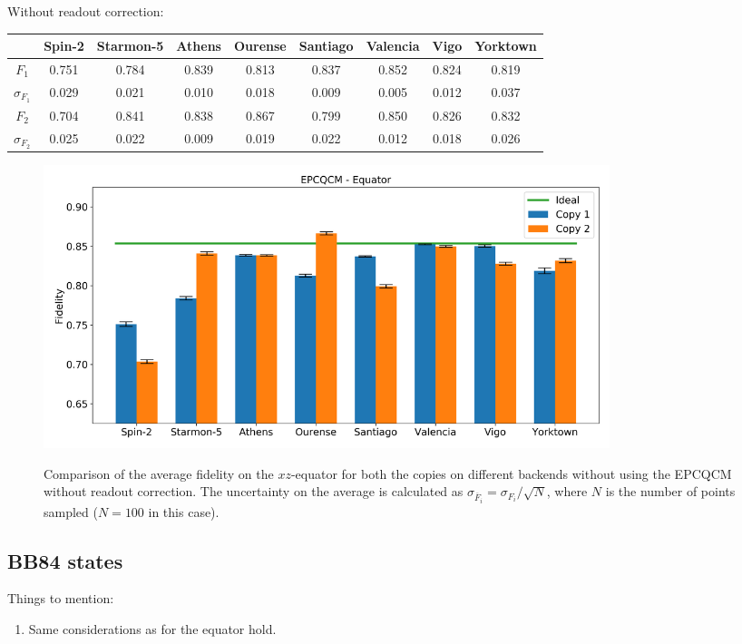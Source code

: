 Without readout correction:
\begin{table}[H]
    \centering
    \begin{tabular}{|c|c|c|c|c|c|c|c|c|}
    \hline
    \textbf{} & \textbf{Spin-2} & \textbf{Starmon-5} & \textbf{Athens} & \textbf{Ourense} & \textbf{Santiago} & \textbf{Valencia} & \textbf{Vigo} & \textbf{Yorktown} \\ \hline
    $F_1$              & 0.751  & 0.784 & 0.839 & 0.813 & 0.837 & 0.852 & 0.824 & 0.819 \\ \hline
    $\sigma_{F_1}$     & 0.029  & 0.021 & 0.010 & 0.018 & 0.009 & 0.005 & 0.012 & 0.037 \\ \hline
    $F_2$              & 0.704  & 0.841 & 0.838 & 0.867 & 0.799 & 0.850 & 0.826 & 0.832 \\ \hline
    $\sigma_{F_2}$     & 0.025  & 0.022 & 0.009 & 0.019 & 0.022 & 0.012 & 0.018 & 0.026 \\ \hline
    \end{tabular}
\end{table}
\begin{figure}[H]
  \centering
          \includegraphics[width=0.8\textwidth]{Figures/Economical/Histograms/histo_equator.png}
      \label{fig:epc_histo_equator_not_corrected}
      \caption{Comparison of the average fidelity on the $xz$-equator for both the copies on different backends without using the EPCQCM without readout correction. The uncertainty on the average is calculated as $\sigma_{\overline{F}_i}=\sigma_{F_i}/\sqrt{N}$, where $N$ is the number of points sampled ($N=100$ in this case).}
\end{figure}

\subsection{BB84 states}
Things to mention:
\begin{enumerate}
  \item Same considerations as for the equator hold.
\end{enumerate} 

